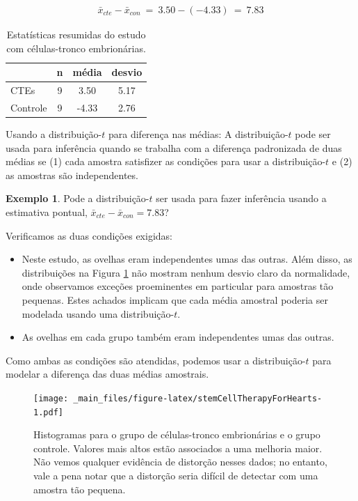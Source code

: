 \documentclass[
]{book}
\theoremstyle{definition}
\theoremstyle{definition}
\newtheorem{example}{Exemplo}[chapter]
\theoremstyle{definition}
\theoremstyle{definition}
\theoremstyle{remark}
\begin{document}
\begin{eqnarray*}
\bar{x}_{cte} - \bar{x}_{con}\ =\ 3.50 - (-4.33)\ =\ 7.83
\end{eqnarray*}

\begin{table}

\caption{\label{tab:summaryStatsForSheepHeartDataWhoReceivedMiceESCs}Estatísticas resumidas do estudo com células-tronco embrionárias.}
\centering
\begin{tabular}[t]{l|c|c|c}
\hline
  & n & média & desvio\\
\hline
CTEs & 9 & 3.50 & 5.17\\
\hline
Controle & 9 & -4.33 & 2.76\\
\hline
\end{tabular}
\end{table}

Usando a distribuição-\(t\) para diferença nas médias: A distribuição-\(t\) pode ser usada para inferência quando se trabalha com a diferença padronizada de duas médias se (1) cada amostra satisfizer as condições para usar a distribuição-\(t\) e (2) as amostras são independentes.

\begin{example}
\protect\hypertarget{exm:unnamed-chunk-200}{}{\label{exm:unnamed-chunk-200} }Pode a distribuição-\(t\) ser usada para fazer inferência usando a estimativa pontual, \(\bar{x}_{cte} - \bar{x}_{con} = 7.83\)?
\end{example}

Verificamos as duas condições exigidas:

\begin{itemize}
\item
  Neste estudo, as ovelhas eram independentes umas das outras. Além disso, as distribuições na Figura \ref{fig:stemCellTherapyForHearts} não mostram nenhum desvio claro da normalidade, onde observamos exceções proeminentes em particular para amostras tão pequenas. Estes achados implicam que cada média amostral poderia ser modelada usando uma distribuição-\(t\).
\item
  As ovelhas em cada grupo também eram independentes umas das outras.
\end{itemize}

Como ambas as condições são atendidas, podemos usar a distribuição-\(t\) para modelar a diferença das duas médias amostrais.

\begin{figure}
\centering
\texttt{[image: \_main\_files/figure-latex/stemCellTherapyForHearts-1.pdf]}
\caption{\label{fig:stemCellTherapyForHearts}Histogramas para o grupo de células-tronco embrionárias e o grupo controle. Valores mais altos estão associados a uma melhoria maior. Não vemos qualquer evidência de distorção nesses dados; no entanto, vale a pena notar que a distorção seria difícil de detectar com uma amostra tão pequena.}
\end{figure}
\end{document}
